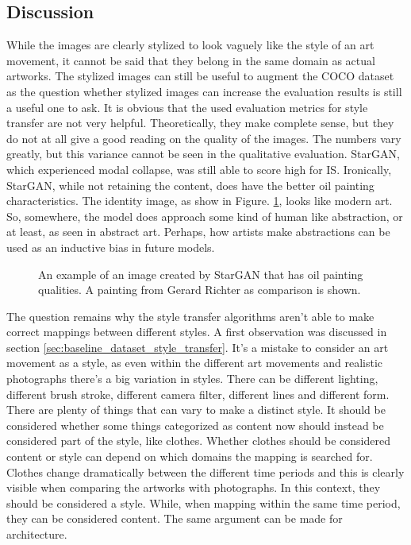 \subsection{Discussion}
\label{sec:baseline_discussion_style_transfer}
While the images are clearly stylized to look vaguely like the style of an art movement, it cannot be said that they belong in the same domain as actual artworks.
The stylized images can still be useful to augment the COCO dataset as the question whether stylized images can increase the evaluation results is still a useful one to ask.
It is obvious that the used evaluation metrics for style transfer are not very helpful.
Theoretically, they make complete sense, but they do not at all give a good reading on the quality of the images.
The numbers vary greatly, but this variance cannot be seen in the qualitative evaluation.
StarGAN, which experienced modal collapse, was still able to score high for \gls{IS}.
Ironically, StarGAN, while not retaining the content, does have the better oil painting characteristics.
The identity image, as show in Figure. \ref{fig:style_transfer_stargan_identity_image}, looks like modern art.
So, somewhere, the model does approach some kind of human like abstraction, or at least, as seen in abstract art.
Perhaps, how artists make abstractions can be used as an inductive bias in future models.

\begin{figure}[h]
    \centering
	\caption{
        An example of an image created by StarGAN that has oil painting qualities. A painting from Gerard Richter as comparison is shown.
    }
    \label{fig:style_transfer_stargan_identity_image}
\end{figure}

The question remains why the style transfer algorithms aren't able to make correct mappings between different styles.
A first observation was discussed in section \ref{sec:baseline_dataset_style_transfer}.
It's a mistake to consider an art movement as a style, as even within the different art movements and realistic photographs there's a big variation in styles.
There can be different lighting, different brush stroke, different camera filter, different lines and different form.
There are plenty of things that can vary to make a distinct style.
It should be considered whether some things categorized as content now should instead be considered part of the style, like clothes.
Whether clothes should be considered content or style can depend on which domains the mapping is searched for.
Clothes change dramatically between the different time periods and this is clearly visible when comparing the artworks with photographs.
In this context, they should be considered a style.
While, when mapping within the same time period, they can be considered content.
The same argument can be made for architecture.


